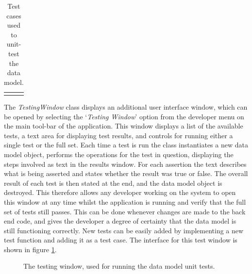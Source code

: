 \begin{longtable}{ l p{10cm} }
 
\caption[Data Model Test Cases]{Test cases used to unit-test the data model.}\\
 \label{tab:DataModelTestCases}
\end{longtable}

The \textit{TestingWindow} class displays an additional user interface window, which can be opened by selecting the `\textit{Testing Window}' option from the developer menu on the main tool-bar of the application. This window displays a list of the available tests, a text area for displaying test results, and controls for running either a single test or the full set. Each time a test is run the class instantiates a new data model object, performs the operations for the test in question, displaying the steps involved as text in the results window. For each assertion the text describes what is being asserted and states whether the result was true or false. The overall result of each test is then stated at the end, and the data model object is destroyed. This therefore allows any developer working on the system to open this window at any time whilst the application is running and verify that the full set of tests still passes. This can be done whenever changes are made to the back end code, and gives the developer a degree of certainty that the data model is still functioning correctly. New tests can be easily added by implementing a new test function and adding it as a test case. The interface for this test window is shown in figure \ref{fig:TestingWindow}.

\begin{figure}
 \centering
 \decoRule
 \caption[Testing Window]{The testing window, used for running the data model unit tests.}
 \label{fig:TestingWindow}
\end{figure}

